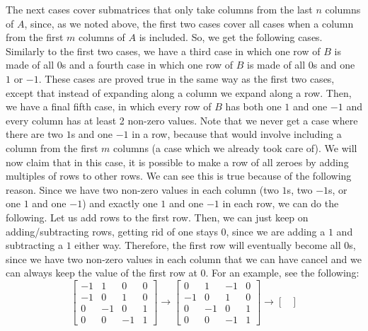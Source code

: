 \documentclass{article}
\begin{document}
\begin{description}
        The next cases cover submatrices that only take columns from the last
        $n$ columns of $A$, since, as we noted above, the first two cases cover
        all cases when a column from the first $m$ columns of $A$ is included.
        So, we get the following cases. Similarly to the first two cases, we
        have a third case in which one row of $B$ is made of all $0$s and a
        fourth case in which one row of $B$ is made of all $0$s and one
        $1$ or $-1$. These cases are proved true in the same way as the first
        two cases, except that instead of expanding along a column we expand
        along a row. Then, we have a final fifth case, in which every row of $B$ has
        both one $1$ and one $-1$ and every column has at least 2 non-zero
        values. Note that we never get a case where there are
        two $1$s and one $-1$ in a row, because that would involve including a
        column from the first $m$ columns (a case which we already took care of).
        We will now claim that in this case, it is possible to make a row of
        all zeroes by adding multiples of rows to other rows. We
        can see this is true because of the following reason. Since we have two
        non-zero values in each column (two $1$s, two $-1$s, or
        one $1$ and one $-1$) and exactly one $1$ and one $-1$ in each row,
        we can do the following. Let us add rows to the
        first row. Then, we can just keep on adding/subtracting rows, getting rid of one
        stays 0, since we are adding a $1$ and subtracting a $1$ either
        way. Therefore, the first row will eventually become all $0$s,
        since we have two non-zero values in each column that we can have cancel
        and we can always keep the value of the first row at $0$.
        For an example, see the following:
        \[
        \begin{bmatrix}
        -1 & 1 & 0 & 0\\
        -1 & 0 & 1 & 0\\
         0 & -1 & 0 & 1\\
         0 & 0 & -1 & 1
        \end{bmatrix} \rightarrow
        \begin{bmatrix}
         0 & 1 & -1 & 0\\
        -1 & 0 & 1 & 0\\
         0 & -1 & 0 & 1\\
         0 & 0 & -1 & 1
        \end{bmatrix} \rightarrow
        \begin{bmatrix}

\end{bmatrix}\]
\end{description}
\end{document}
